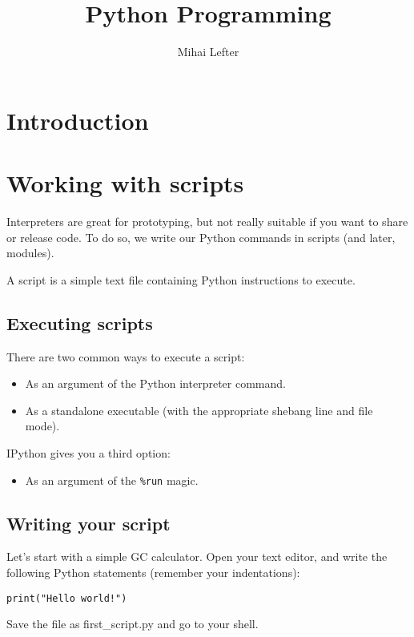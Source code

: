 \documentclass[aspectratio=1610,slidestop]{beamer}
\author{Mihai Lefter}
\title{Python Programming}
\newenvironment{pythonfile}[1]
 {\begin{tcolorbox}[title=#1,
                    title filled=false,
                    coltitle=LUMCDonkerblauw,
                    fonttitle=\scriptsize,
                    fontupper=\footnotesize,
                    enhanced,
                    drop small lifted shadow,
                    boxrule=0.1mm,
                    leftrule=5mm,
                    rulecolor=white,
                    left=0.1cm,
                    colback=white!92!black,
                    colframe=scriptback]}
 {\end{tcolorbox}}
\begin{document}


\section{Introduction}
\makeTableOfContents


\section{Working with scripts}

\begin{pframe}
 Interpreters are great for prototyping, but not really suitable if you want to
 share or release code. To do so, we write our Python commands in scripts (and
 later, modules).

 A script is a simple text file containing Python instructions to execute.
\end{pframe}


\subsection{Executing scripts}
\begin{pframe}
 There are two common ways to execute a script:
  \begin{itemize}
   \item As an argument of the Python interpreter command.
   \item As a standalone executable (with the appropriate shebang line and
   file mode).
  \end{itemize}
  \medskip

  IPython gives you a third option:
  \begin{itemize}
   \item As an argument of the \lstinline{%run} magic.
  \end{itemize}
\end{pframe}


\subsection{Writing your script}
\begin{pframe}
 Let's start with a simple GC calculator. Open your text editor, and write the
 following Python statements (remember your indentations):

 \begin{pythonfile}{first\_script.py}
  \begin{verbatim}
print("Hello world!")
  \end{verbatim}
 \end{pythonfile}
Save the file as first\_script.py and go to your shell.
\end{pframe}
\end{document}
